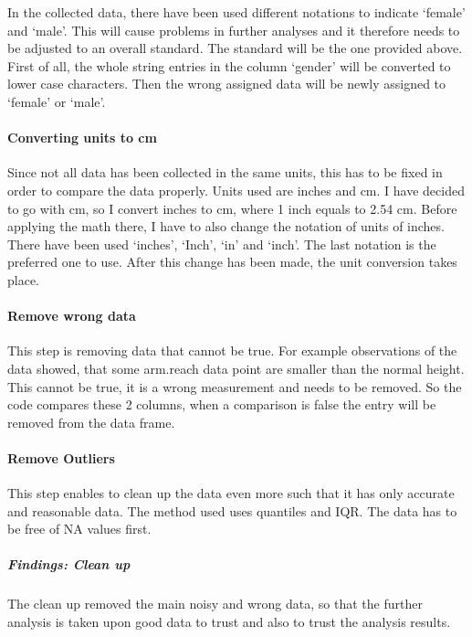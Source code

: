 \documentclass[]{article}
\begin{document}
In the collected data, there have been used different notations to
indicate `female' and `male'. This will cause problems in further
analyses and it therefore needs to be adjusted to an overall standard.
The standard will be the one provided above. First of all, the whole
string entries in the column `gender' will be converted to lower case
characters. Then the wrong assigned data will be newly assigned to
`female' or `male'.

\paragraph{Converting units to cm}
\label{sec:appendix-convert-units-cm}

Since not all data has been collected in the same units, this has to be
fixed in order to compare the data properly. Units used are inches and
cm. I have decided to go with cm, so I convert inches to cm, where 1
inch equals to 2.54 cm. Before applying the math there, I have to also
change the notation of units of inches. There have been used `inches',
`Inch', `in' and `inch'. The last notation is the preferred one to use.
After this change has been made, the unit conversion takes place.

\paragraph{Remove wrong data}
\label{sec:appendix-wrong-data}

This step is removing data that cannot be true. For example observations
of the data showed, that some arm.reach data point are smaller than the
normal height. This cannot be true, it is a wrong measurement and needs
to be removed. So the code compares these 2 columns, when a comparison
is false the entry will be removed from the data frame.

\paragraph{Remove Outliers}
\label{sec:appendix-remove-outliers}

This step enables to clean up the data even more such that it has only
accurate and reasonable data. The method used uses quantiles and IQR.
The data has to be free of NA values first.

\subparagraph{Findings: Clean up}
\label{sec:appendix-findings-clean-up}

The clean up removed the main noisy and wrong data, so that the further
analysis is taken upon good data to trust and also to trust the analysis
results.
\end{document}

